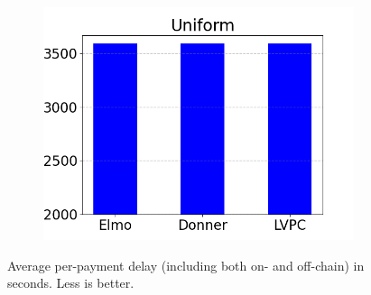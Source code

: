 \begin{figure}
\begin{subfigure}{.3293\textwidth}
  \includegraphics[width=\textwidth]{../simulation/Delays_uniform.png}
  \end{subfigure}
  \caption{Average per-payment delay (including both on- and off-chain) in
  seconds. Less is better.}
  \label{graph:delays}
  \end{figure}
